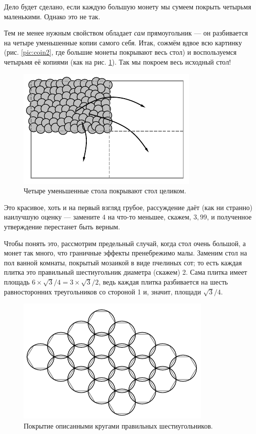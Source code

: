Дело будет сделано, если каждую большую монету мы сумеем покрыть четырьмя маленькими. Однако это не так.

Тем не менее нужным свойством обладает \emph{сам} прямоугольник --- он разбивается на четыре уменьшенные копии самого себя.
Итак, сожмём вдвое всю картинку (рис. \ref{pic:coin2}, где большие монеты покрывают весь стол) и воспользуемся четырьмя её копиями (как на рис. \ref{pic:coin3}).
Так мы покроем весь исходный стол!


\begin{figure}[t!]
\centering
\includegraphics[scale=1]{pics/coin3}
\caption{Четыре уменьшенные стола покрывают стол целиком.}
\label{pic:coin3}
\end{figure}

\medskip

Это красивое, хоть и на первый взгляд грубое, рассуждение даёт (как ни странно) наилучшую оценку --- замените $4$ на что-то меньшее, скажем, $3{,}99$, и полученное утверждение перестанет быть верным.

Чтобы понять это, рассмотрим предельный случай, когда стол очень большой, а монет так много, что граничные эффекты пренебрежимо малы.
Заменим стол на пол ванной комнаты, покрытый мозаикой в виде пчелиных сот;
то есть каждая плитка это правильный шестиугольник диаметра (скажем) 2.
Сама плитка имеет площадь $6\times\sqrt{3}/4=3\times\sqrt{3}/2$, ведь каждая плитка разбивается на шесть равносторонних треугольников со стороной 1 и, значит, площади $\sqrt{3}/4$.

\begin{figure}[t!]
\centering
\includegraphics[scale=1]{pics/coin4}
\caption{Покрытие описанными кругами правильных шестиугольников.}
\label{pic:coin4}
\end{figure}

